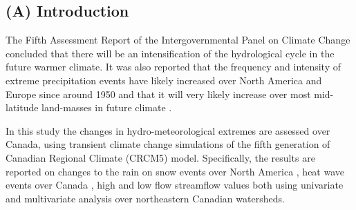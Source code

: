 \documentclass[a0,landscape]{a0poster}
\begin{document}
\vspace{0.1cm} %


\begin{multicols*}{4} %


\color{DarkSlateGray} %

\section*{(A) Introduction}
The Fifth Assessment Report of the Intergovernmental Panel on Climate Change
concluded that there will be an intensification of the hydrological cycle in the
future warmer climate. It was also reported that the frequency and intensity of
extreme precipitation events have likely increased over North America and Europe
since around 1950 \citep{hartmann2013} and that it will very likely increase
over most mid-latitude land-masses in future climate \citep{collins2013}.

In this study the changes in hydro-meteorological extremes are assessed over
Canada, using transient climate change simulations of the fifth generation of
Canadian Regional Climate (CRCM5) model. Specifically, the results are reported
on changes to the rain on snow events over North America \citep{jeong2016ros}, heat wave events over
Canada \citep{jeong2016heatwave}, high and low flow streamflow values \citep{jeong2014copula,huziy2016impact} both using
univariate and multivariate analysis over northeastern Canadian watersheds.




\color{DarkSlateGray} %


\end{multicols*}
\end{document}
